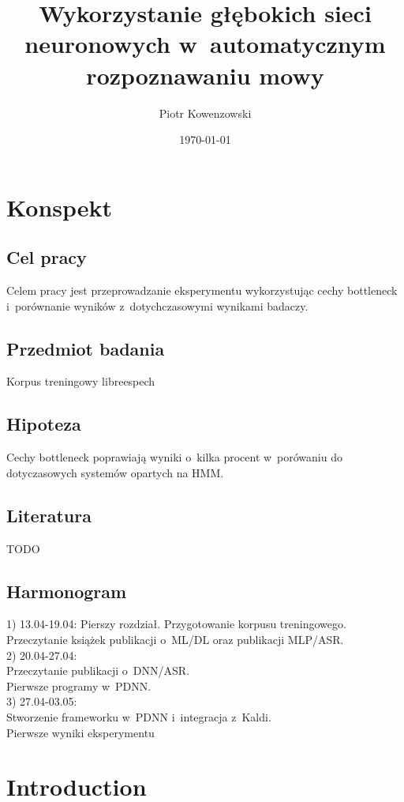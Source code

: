 \documentclass[a4paper]{report}
\theoremstyle{definition}
\begin{document}
\title{Wykorzystanie głębokich sieci neuronowych w~automatycznym rozpoznawaniu mowy}
\author{Piotr Kowenzowski}
\date{\today}
\maketitle
\tableofcontents
\newpage

\chapter{Konspekt}
\section{Cel pracy} Celem pracy jest przeprowadzanie eksperymentu wykorzystując cechy bottleneck i~porównanie wyników z~dotychczasowymi wynikami badaczy. 
\section{Przedmiot badania} Korpus treningowy libreespech
\section{Hipoteza} Cechy bottleneck poprawiają wyniki o~kilka procent w~porówaniu do dotyczasowych systemów opartych na HMM.
\section{Literatura} TODO
\section{Harmonogram}
1) 13.04-19.04:
	Pierszy rozdział. Przygotowanie korpusu treningowego. Przeczytanie książek publikacji o~ML/DL oraz publikacji MLP/ASR. \\
2) 20.04-27.04: \\
	Przeczytanie publikacji o~DNN/ASR. \\
	Pierwsze programy w~PDNN. \\
3) 27.04-03.05: \\
	Stworzenie frameworku w~PDNN i~integracja z~Kaldi. \\
	Pierwsze wyniki eksperymentu \\



\listoftodos

\chapter{Introduction}
\end{document}
